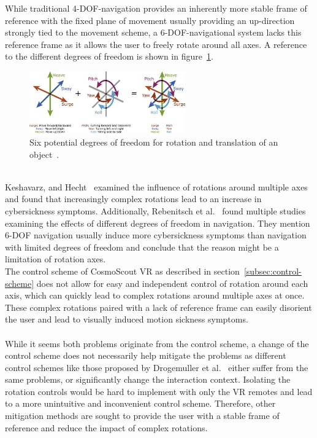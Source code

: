 While traditional 4-DOF-navigation provides an inherently more stable frame of reference with the fixed plane of
movement usually providing an up-direction strongly tied to the movement scheme, a 6-DOF-navigational system lacks this
reference frame as it allows the user to freely rotate around all axes.
A reference to the different degrees of freedom is shown in figure~\ref{fig:6-dof-reference}.
\begin{figure}[h]
    \centering
    \includegraphics[width=0.6\textwidth]{content/3_current_state/img/6-DOF-reference[Fragaszy2018]}
    \caption{Six potential degrees of freedom for rotation and translation of an object~\cite{Fragaszy2018}.}
    \label{fig:6-dof-reference}
\end{figure}
\\
Keshavarz, and Hecht~\cite{Keshavarz2011b} examined the influence of rotations around multiple axes and found that
increasingly complex rotations lead to an increase in cybersickness symptoms.
Additionally, Rebenitsch et al.~\cite{Rebenitsch2016} found multiple studies examining the effects of different
degrees of freedom in navigation.
They mention 6-DOF navigation usually induce more cybersickness symptoms than navigation with limited degrees of
freedom and conclude that the reason might be a limitation of rotation axes.
\\
The control scheme of CosmoScout VR as described in section~\ref{subsec:control-scheme} does not allow for easy and
independent control of rotation around each axis, which can quickly lead to complex rotations around multiple axes at
once.
These complex rotations paired with a lack of reference frame can easily disorient the user and lead to visually
induced motion sickness symptoms.
\\
\\
While it seems both problems originate from the control scheme, a change of the control scheme does not necessarily
help mitigate the problems as different control schemes like those proposed by Drogemuller et al.~\cite{Drogemuller2020}
either suffer from the same problems, or significantly change the interaction context.
Isolating the rotation controls would be hard to implement with only the VR remotes and lead to a more unintuitive
and inconvenient control scheme.
Therefore, other mitigation methods are sought to provide the user with a stable frame of reference and reduce the
impact of complex rotations.



